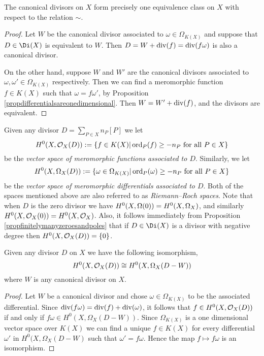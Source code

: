     \begin{cor}
    The canonical divisors on $X$ form precisely one equivalence class on $X$ with respect to the relation $\sim$.
    \end{cor}
    \begin{proof}
    Let $W$ be the canonical divisor associated to $\omega \in \Omega_{K(X)}$ and suppose that $D \in \Di(X)$ is equivalent to $W$.
    Then $D = W + \operatorname{div}(f) = \operatorname{div}(f \omega)$ is also a canonical divisor.

    On the other hand, suppose $W$ and $W'$ are the canonical divisors associated to $\omega, \omega' \in \Omega_{K(X)}$ respectively.
    Then we can find a meromorphic function $f \in K(X)$ such that $\omega = f\omega'$, by Proposition \ref{propdifferentialsareonedimensional}.
    Then $W = W' + \operatorname{div}(f)$, and the divisors are equivalent.
    \end{proof}

Given any divisor $D = \sum_{P \in X} n_P[P]$ we let
    \[
    H^0(X,{\cal O}_X(D)) : = \{ f \in K(X) | \operatorname{ord}_P(f) \geq -n_P\ \text{for all}\ P \in X\}
    \]
be the \emph{vector space of meromorphic functions associated to $D$}.
Similarly, we let 
    \[
    H^0(X,\Omega_X(D)) :  = \{ \omega \in \Omega_{K(X)} | \operatorname{ord}_P(\omega) \geq -n_P \ \text{for all} \ P \in X\}
    \]
be the \emph{vector space of meromorphic differentials associated to $D$}.
Both of the spaces mentioned above are also referred to as \emph{Riemann--Roch spaces}.
Note that when $D$ is the zero divisor we have $H^0(X,\Omega(0)) = {H^0(X,\Omega_X)}$, and similarly $H^0(X,{\cal O}_X(0)) = H^0(X,{\cal O}_X)$.
Also, it follows immediately from Proposition \ref{propfinitelymanyzeroesandpoles} that if $D \in \Di(X)$ is a divisor with negative degree then $H^0(X,{\cal O}_X(D)) = \{0\}$.

    \begin{lem}\label{lemisomorphismofdifferentialsandfunctions}
    Given any divisor $D$ on $X$ we have the following isomorphism,
        \[
        H^0(X,{\cal O}_X(D)) \cong H^0(X,\Omega_X(D - W))
        \]
    where $W$ is any canonical divisor on $X$.
    \end{lem}
    \begin{proof}
    Let $W$ be a canonical divisor and chose $\omega\in \Omega_{K(X)}$ to be the associated differential.
    Since $\operatorname{div}(f \omega) = \operatorname{div}(f) + \operatorname{div}(\omega)$, it follows that $f \in H^0(X,{\cal O}_X(D))$ if and only if $f \omega \in H^0(X,\Omega_X(D - W))$.
    Since $\Omega_{K(X)}$ is a one dimensional vector space over $K(X)$ we can find a unique $f \in K(X)$ for every differential $\omega'$ in $H^0(X,\Omega_X(D - W)$ such that $\omega' = f \omega$.
    Hence the map $f \mapsto f\omega$ is an isomorphism.
    \end{proof}

